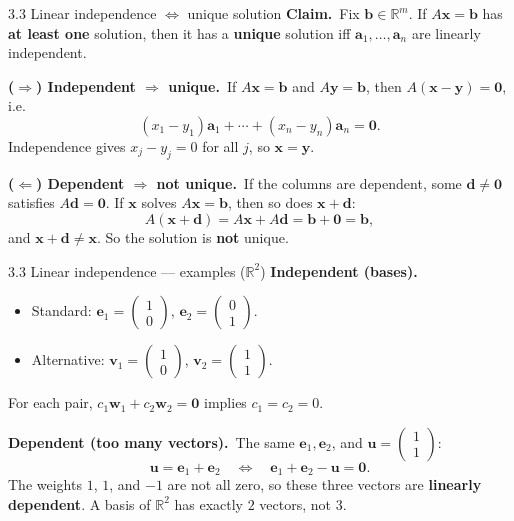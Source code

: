 \documentclass[11pt,aspectratio=169]{beamer}
\begin{document}
\begin{frame}{3.3 Linear independence $\Leftrightarrow$ unique solution}
  \footnotesize
  \textbf{Claim.}\
  Fix $\mathbf{b}\in\mathbb{R}^m$. If $A\mathbf{x}=\mathbf{b}$ has \textbf{at least one} solution, then
  it has a \textbf{unique} solution iff $\mathbf{a}_1,\ldots,\mathbf{a}_n$ are linearly independent.

  \medskip
  \textbf{($\Rightarrow$) Independent $\Rightarrow$ unique.}\
  If $A\mathbf{x}=\mathbf{b}$ and $A\mathbf{y}=\mathbf{b}$, then
  $A(\mathbf{x}-\mathbf{y})=\mathbf{0}$, i.e.\
  \[
    (x_1-y_1)\mathbf{a}_1+\cdots+(x_n-y_n)\mathbf{a}_n=\mathbf{0}.
  \]
  Independence gives $x_j-y_j=0$ for all $j$, so $\mathbf{x}=\mathbf{y}$.

  \medskip
  \textbf{($\Leftarrow$) Dependent $\Rightarrow$ not unique.}\
  If the columns are dependent, some $\mathbf{d}\neq\mathbf{0}$ satisfies
  $A\mathbf{d}=\mathbf{0}$.
  If $\mathbf{x}$ solves $A\mathbf{x}=\mathbf{b}$, then so does $\mathbf{x}+\mathbf{d}$:
  \[
    A(\mathbf{x}+\mathbf{d})=A\mathbf{x}+A\mathbf{d}=\mathbf{b}+\mathbf{0}=\mathbf{b},
  \]
  and $\mathbf{x}+\mathbf{d}\neq\mathbf{x}$. So the solution is \textbf{not} unique.
\end{frame}

\begin{frame}{3.3 Linear independence --- examples ($\mathbb{R}^2$)}
  \footnotesize
  \textbf{Independent (bases).}\
  \begin{itemize}
    \item Standard: $\mathbf{e}_1=\begin{pmatrix}1\\ 0\end{pmatrix}$,
      $\mathbf{e}_2=\begin{pmatrix}0\\ 1\end{pmatrix}$.
    \item Alternative: $\mathbf{v}_1=\begin{pmatrix}1\\ 0\end{pmatrix}$,
      $\mathbf{v}_2=\begin{pmatrix}1\\ 1\end{pmatrix}$.
  \end{itemize}
  For each pair, $c_1\mathbf{w}_1+c_2\mathbf{w}_2=\mathbf{0}$ implies $c_1=c_2=0$.

  \medskip
  \textbf{Dependent (too many vectors).}\
  The same $\mathbf{e}_1,\mathbf{e}_2$, and $\mathbf{u}=\begin{pmatrix}1\\ 1\end{pmatrix}$:
  \[
    \mathbf{u}=\mathbf{e}_1+\mathbf{e}_2
    \quad\Longleftrightarrow\quad
    \mathbf{e}_1+\mathbf{e}_2-\mathbf{u}=\mathbf{0}.
  \]
  The weights $1$, $1$, and $-1$ are not all zero, so these three vectors are \textbf{linearly dependent}.
  A basis of $\mathbb{R}^2$ has exactly $2$ vectors, not $3$.
\end{frame}
\end{document}
